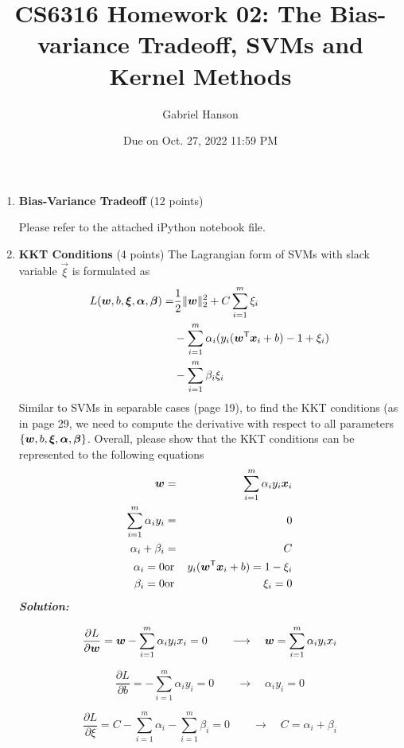 \documentclass[10pt]{article}
\title{CS6316 Homework 02: The Bias-variance Tradeoff, SVMs and Kernel Methods}
\author{Gabriel Hanson}
\date{Due on Oct. 27, 2022 11:59 PM}
\begin{document}
 
\maketitle

\begin{enumerate}
\item \textbf{Bias-Variance Tradeoff} (12 points)

Please refer to the attached iPython notebook file.

\pagebreak
\item \textbf{KKT Conditions} (4 points) The Lagrangian form of SVMs with slack variable $\vec{\xi}$ is formulated as
  \begin{equation}
    \label{eq:non-sep-svm}
    \begin{split}
      L(\boldsymbol{w},b,\bm{\xi},\bm{\alpha},\bm{\beta})= & \frac{1}{2}\|\boldsymbol{w}\|_2^2 + C\sum_{i=1}^{m}\xi_i\\
      & -\sum_{i=1}^{m}\alpha_i(y_i(\boldsymbol{w}^{\textsf{T}}\boldsymbol{x}_i+b)-1+\xi_i)\\
      & - \sum_{i=1}^{m}\beta_i\xi_i
    \end{split}
  \end{equation}
  Similar to SVMs in separable cases (page 19), to find the KKT conditions (as in page 29, we need to compute the derivative with respect to all parameters $\{\boldsymbol{w},b,\bm{\xi},\bm{\alpha},\bm{\beta}\}$. Overall, please show that the KKT conditions can be represented to the following equations
  \begin{eqnarray}
    \boldsymbol{w} &=& \sum_{i=1}^{m}{\alpha_i}y_i\boldsymbol{x}_i\\
    \sum_{i=1}^{m}\alpha_iy_i &=& 0 \\
    \alpha_i + \beta_i &=& C\\
    \alpha_i = 0 &\text{or}& y_i(\boldsymbol{w}^{\textsf{T}}\boldsymbol{x}_i + b) = 1 - \xi_i\\
    \beta_i = 0 &\text{or}& \xi_i = 0
  \end{eqnarray}
\hspace{\parindent}\textit{\textbf{Solution:}}

$$  \frac{\partial L}{\partial \boldsymbol{w}} = \boldsymbol{w} - \sum_{i=1}^{m} \alpha_i y_i x_i  = 0 \quad \quad \longrightarrow  \quad \boldsymbol{w} = \sum_{i=1}^{m} \alpha_i y_i x_i $$

$$ \frac{\partial L}{\partial b} = - \sum_{i=1}^{m} \alpha_i y_i = 0 \quad \quad \longrightarrow \quad \alpha_i y_i = 0  $$

$$ \frac{\partial L}{\partial {\xi}}  = C - \sum_{i=1}^{m} \alpha_i - \sum_{i=1}^{m} \beta_i = 0 \quad \quad \longrightarrow \quad C = \alpha_i + \beta_i $$


\end{enumerate}
\end{document}
